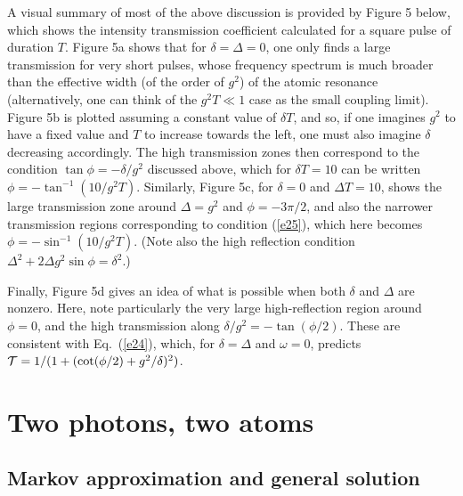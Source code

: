 \documentclass[aps,pra,twocolumn,floatfix,superscriptaddress]{revtex4}
\begin{document}
A visual summary of most of the above discussion is provided by Figure 5 below, which shows the intensity transmission coefficient calculated for a square pulse of duration $T$.  Figure 5a shows that for $\delta = \Delta = 0$, one only finds a large transmission for very short pulses, whose frequency spectrum is much broader than the effective width (of the order of $g^2$) of the atomic resonance (alternatively, one can think of the $g^2T\ll 1$ case as the small coupling limit).  Figure 5b is plotted assuming a constant value of $\delta T$, and so, if one imagines $g^2$ to have a fixed value and $T$ to increase towards the left, one must also imagine $\delta$ decreasing accordingly.  The high transmission zones then correspond to the condition $\tan\phi = -\delta/g^2$ discussed above, which for $\delta T =10$ can be written $\phi = -\tan^{-1}(10/g^2T)$.  Similarly, Figure 5c, for $\delta=0$ and $\Delta T = 10$, shows the large transmission zone around $\Delta = g^2$ and $\phi=-3\pi/2$, and also the narrower transmission regions corresponding to condition (\ref{e25}), which here becomes $\phi = -\sin^{-1}(10/g^2T)$. (Note also the high reflection condition $\Delta^2 + 2\Delta g^2\sin\phi=\delta^2$.) 

Finally, Figure 5d gives an idea of what is possible when both $\delta$ and $\Delta$ are nonzero.  Here, note particularly the very large high-reflection region around $\phi=0$, and the high transmission along $\delta/g^2 = -\tan(\phi/2)$.  These are consistent with Eq.~(\ref{e24}), which, for $\delta=\Delta$ and $\omega=0$, predicts ${\cal T} = 1/(1+(\cot(\phi/2) + g^2/\delta)^2)$.









\section{Two photons, two atoms}

\subsection{Markov approximation and general solution}
\end{document}
